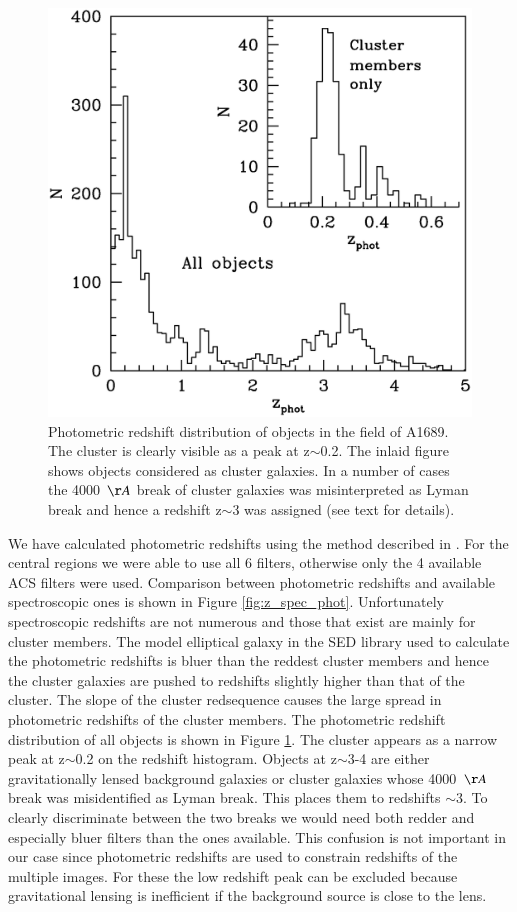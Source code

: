 \documentclass[useAMS,usenatbib]{mn2e}
\newcounter{one}   \setcounter{one}{1}
\newcounter{two}   \setcounter{two}{2}
\begin{document}
\begin{figure}
  \centering
  \includegraphics[height=0.9\columnwidth]{figs/zhist.ps}
  \caption{Photometric redshift distribution of objects in the field
  of A1689. The cluster is clearly visible as a peak at
  z$\sim$0.2. The inlaid figure shows objects considered as cluster
  galaxies. In a number of cases the 4000~$\AA$ break of cluster
  galaxies was misinterpreted as Lyman break and hence a redshift
  z$\sim$3 was assigned (see text for details).}
  \label{fig:z_spec_phot2}
\end{figure}

We have calculated photometric redshifts using the method described in
\citet{bender:01}. For the central regions we were able to use all 6
filters, otherwise only the 4 available ACS filters were
used. Comparison between photometric redshifts and available
spectroscopic ones is shown in Figure
\ref{fig:z_spec_phot}. Unfortunately spectroscopic redshifts are not
numerous and those that exist are mainly for cluster members. The
model elliptical galaxy in the SED library used to calculate the
photometric redshifts is bluer than the reddest cluster members and
hence the cluster galaxies are pushed to redshifts slightly higher
than that of the cluster. The slope of the cluster redsequence causes
the large spread in photometric redshifts of the cluster members. The
photometric redshift distribution of all objects is shown in Figure
\ref{fig:z_spec_phot2}. The cluster appears as a narrow peak at
z$\sim$0.2 on the redshift histogram. Objects at z$\sim$3-4 are
either gravitationally lensed background galaxies or cluster galaxies
whose 4000~$\AA$ break was misidentified as Lyman break. This places
them to redshifts $\sim$3. To clearly discriminate between the two
breaks we would need both redder and especially bluer filters than the
ones available. This confusion is not important in our case since
photometric redshifts are used to constrain redshifts of the multiple
images. For these the low redshift peak can be excluded because
gravitational lensing is inefficient if the background source is close
to the lens.
\end{document}
